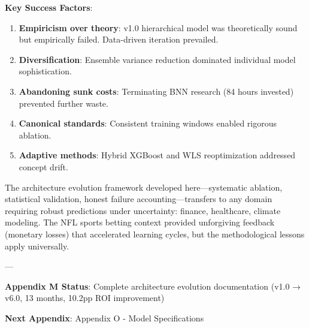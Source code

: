 \textbf{Key Success Factors}:
\begin{enumerate}
\item \textbf{Empiricism over theory}: v1.0 hierarchical model was theoretically sound but empirically failed. Data-driven iteration prevailed.
\item \textbf{Diversification}: Ensemble variance reduction dominated individual model sophistication.
\item \textbf{Abandoning sunk costs}: Terminating BNN research (84 hours invested) prevented further waste.
\item \textbf{Canonical standards}: Consistent training windows enabled rigorous ablation.
\item \textbf{Adaptive methods}: Hybrid XGBoost and WLS reoptimization addressed concept drift.
\end{enumerate}

The architecture evolution framework developed here—systematic ablation, statistical validation, honest failure accounting—transfers to any domain requiring robust predictions under uncertainty: finance, healthcare, climate modeling. The NFL sports betting context provided unforgiving feedback (monetary losses) that accelerated learning cycles, but the methodological lessons apply universally.

---

\textbf{Appendix M Status}: Complete architecture evolution documentation (v1.0 → v6.0, 13 months, 10.2pp ROI improvement)

\textbf{Next Appendix}: Appendix O - Model Specifications
